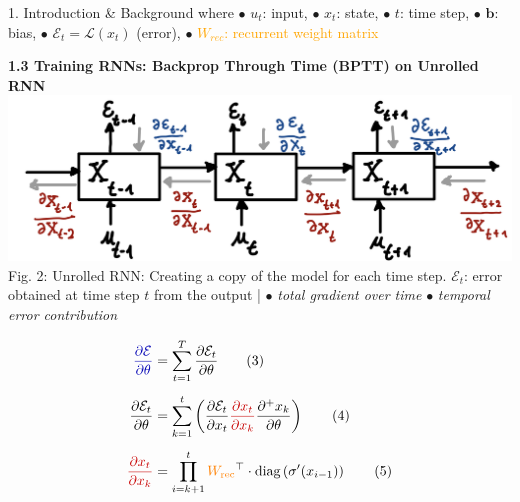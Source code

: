 \documentclass[final]{beamer}
\begin{document}
\begin{frame}[t]
\begin{columns}[t,totalwidth=\textwidth]
\begin{column}{0.3\textwidth}
\begin{block}{1. Introduction \& Background}
        \vspace{0.5em}
        where $\bullet$ $u_t$: input, $\bullet$  $x_t$: state, $\bullet$  $t$: time step, $\bullet$  $\mathbf{b}$: bias,  $\bullet$  $\mathcal{E}_t = \mathcal{L}(x_t)$ (error),  $\bullet$  \textcolor{orange}{$W_{rec}$: recurrent weight matrix}

        \vspace{0.5em}

        \vspace{1em}
        \textbf{1.3 Training RNNs: Backprop Through Time (BPTT) on Unrolled RNN}\\
        \includegraphics[width=0.95\linewidth]{figures/2_fig.png}\\[0.5em]
         Fig. 2: Unrolled RNN: Creating a copy of the model for each time step. \textcolor{myblue}{$\mathcal{E}_t$:}  error obtained at time step $t$ from the output |
          $\bullet$ \textcolor{myblue}{ \textit{total gradient over time}}
        \quad
        $\bullet$ \textcolor{myred}{ \textit{temporal error contribution}}


        \vspace{0.3em}
        \begin{align*}
          \textcolor{myblue}{\frac{\partial \mathcal{E}}{\partial \theta}} &=
          \sum_{t=1}^{T} \frac{\partial \mathcal{E}_t}{\partial \theta} \hspace{2em} \text{(3)} \\[0.5em]
          \frac{\partial \mathcal{E}_t}{\partial \theta} &=
          \sum_{k=1}^{t} 
          \left( {\frac{\partial \mathcal{E}_t}{\partial x_t}} 
          \textcolor{myred}{\frac{\partial x_t}{\partial x_k}}
          \frac{\partial^+ x_k}{\partial \theta} \right) \hspace{2em} \text{(4)} \\[0.5em]
          \textcolor{myred}{\frac{\partial x_t}{\partial x_k}} &=
          \prod_{i=k+1}^{t}
          \textcolor{orange}{W_{\text{rec}}}^\top \cdot \text{diag}\left(\sigma'(x_{i-1})\right) \hspace{2em} \text{(5)}
        \end{align*}
        

\end{block}
\end{column}
\end{columns}
\end{frame}
\end{document}
